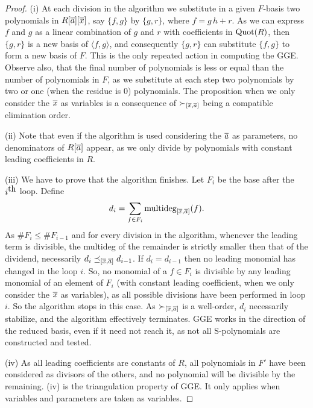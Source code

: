  \begin{proof}

 (i) At each division in the algorithm we substitute in
 a given $F$-basis two polynomials in $R[\overline{a}][\overline{x}]$, say $\{f,g\}$ by
 $\{g,r\}$,  where $f=g\,h+r$.
 As we can express $f$ and $g$ as a
 linear combination  of $g$ and $r$ with coefficients in $\hbox{\rm Quot}(R)$, then  $\{g,r\}$
 is a new basis of $\langle f,g \rangle$, and consequently $\{g,r\}$ can
 substitute $\{f,g\}$ to form a new basis of $F$. This is the only
 repeated action in computing the {\sc GGE}.
 Observe also, that the final
 number of polynomials is less or equal than the number of
 polynomials in $F$, as we substitute at each step two polynomials
 by two or one (when the residue is 0) polynomials.
 The proposition when we only consider the $\overline{x}$ as variables is a
 consequence of $\succ_{[\overline{x},\overline{a}]}$ being a compatible elimination
 order.

 (ii) Note that even if the
 algorithm is used considering the $\overline{a}$ as parameters, no
 denominators of $R[\overline{a}]$ appear, as we only divide by polynomials
 with constant leading coefficients in $R$.

 (iii) We have to prove that the
 algorithm finishes. Let $F_i$ be the base after the $i^{\hbox{\rm th}}$ loop.
 Define
 \[ d_i=\sum_{f \in F_i} \hbox{\rm multideg}_{[\overline{x},\overline{a}]}(f).\]
 As $\#F_i \le \#F_{i-1}$ and for every division in the algorithm,
 whenever the leading term is divisible, the multideg of the
 remainder is strictly smaller then that of the dividend,
 necessarily $d_i \preceq_{[\overline{x},\overline{a}]} d_{i-1}$. If $d_i=d_{i-1}$
 then no leading monomial has changed in the loop $i$. So, no
 monomial of a $f \in F_i$ is divisible by any leading monomial of
 an element of $F_i$ (with constant leading coefficient, when we
 only consider the $\overline{x}$ as variables), as all
 possible divisions have been performed in loop $i$. So the
 algorithm stops in this case.
 As $\succ_{[\overline{x},\overline{a}]}$ is a well-order, $d_i$ necessarily stabilize,
 and the algorithm effectively terminates.
 {\sc GGE} works in the direction of the reduced \Gr
 basis, even if it need not reach it, as not all S-polynomials
 are constructed and tested.

 (iv) As all leading coefficients
are constants of $R$, all polynomials in $F'$ have been considered
as divisors of the others, and no polynomial will be divisible by
the remaining. (iv) is the triangulation property of {\sc GGE}.
 It only applies when variables and parameters are taken as variables.
 \end{proof}

